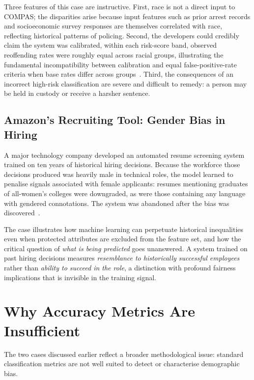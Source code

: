 Three features of this case are instructive.  First, race is not a direct
input to COMPAS; the disparities arise because input features such as prior
arrest records and socioeconomic survey responses are themselves correlated
with race, reflecting historical patterns of policing.  Second, the
developers could credibly claim the system was calibrated, within each
risk-score band, observed reoffending rates were roughly equal across racial
groups, illustrating the fundamental incompatibility between calibration
and equal false-positive-rate criteria when base rates differ across
groups~\cite{chouldechova2017fair}.  Third, the consequences of an incorrect
high-risk classification are severe and difficult to remedy: a person may
be held in custody or receive a harsher sentence.

\subsection{Amazon's Recruiting Tool: Gender Bias in Hiring}
\label{subsec:hiring_bias}

A major technology company developed an automated resume screening system
trained on ten years of historical hiring decisions.  Because the workforce
those decisions produced was heavily male in technical roles, the model
learned to penalise signals associated with female applicants: resumes
mentioning graduates of all-women's colleges were downgraded, as were
those containing any language with gendered connotations.  The system was
abandoned after the bias was discovered~\cite{reuters2018}.

The case illustrates how machine learning can perpetuate historical
inequalities even when protected attributes are excluded from the feature
set, and how the critical question of \emph{what is being predicted} goes
unanswered.  A system trained on past hiring decisions measures
\emph{resemblance to historically successful employees} rather than
\emph{ability to succeed in the role}, a distinction with profound fairness
implications that is invisible in the training signal.

\section{Why Accuracy Metrics Are Insufficient}
\label{sec:limitations_accuracy}

The two cases discussed earlier reflect a broader methodological issue:
standard classification metrics are not well suited to detect or
characterise demographic bias.

